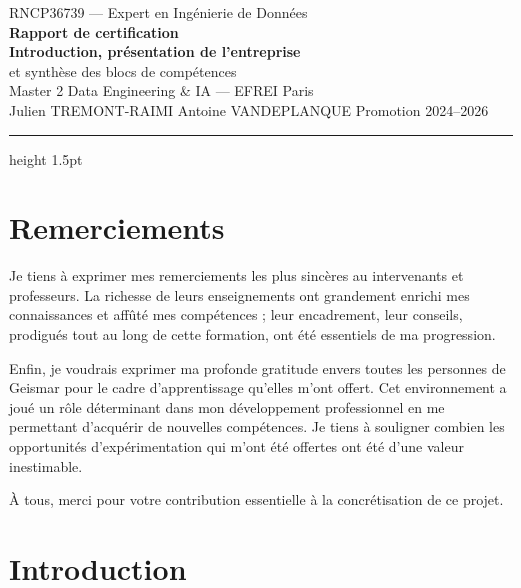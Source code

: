 \documentclass[11pt]{article}
\begin{document}
\thispagestyle{fancy}
\begin{center}
  \vspace*{0.3cm}
  {\small\textcolor{black!55}{RNCP36739 --- Expert en Ingénierie de Données}}\\[6pt]
  {\Huge\bfseries\textcolor{titleNavy}{Rapport de certification}}\\[8pt]
  {\large\bfseries Introduction, présentation de l'entreprise}\\[2pt]
  {\large et synthèse des blocs de compétences}\\[10pt]
  {\normalsize Master 2 Data Engineering \& IA --- EFREI Paris}\\[4pt]
  {\small Julien TREMONT-RAIMI \quad\textbullet\quad Antoine VANDEPLANQUE \quad\textbullet\quad Promotion 2024--2026}
\end{center}

\vspace{4pt}
{\color{titleNavy}\hrule height 1.5pt}
\vspace{10pt}

\section*{Remerciements}

Je tiens à exprimer mes remerciements les plus sincères au intervenants et professeurs. 
La richesse de leurs enseignements ont grandement enrichi mes connaissances 
et affûté mes compétences ; leur encadrement, leur conseils, prodigués tout au long de 
cette formation, ont été  essentiels de ma progression.

Enfin, je voudrais exprimer ma profonde gratitude envers toutes les personnes de Geismar pour le
cadre d'apprentissage qu'elles m'ont offert. Cet environnement a joué un rôle déterminant dans mon 
développement professionnel en me permettant d'acquérir de nouvelles compétences. Je tiens à souligner 
combien les opportunités d'expérimentation qui m'ont été offertes ont été d'une valeur inestimable.

\medskip
\noindent À tous, merci pour votre contribution essentielle à la concrétisation de ce
projet.

\clearpage

\section{Introduction}
\end{document}
